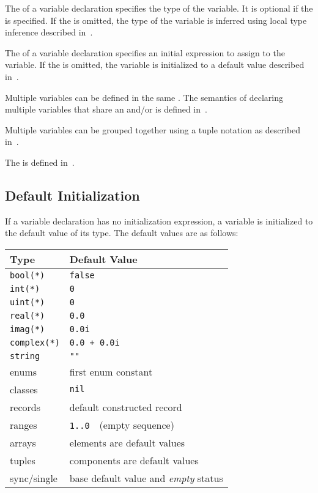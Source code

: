 The  of a variable declaration specifies the type of
the variable.  It is optional if the  is
specified.  If the  is omitted, the type of the
variable is inferred using local type inference described
in~.

The  of a variable declaration specifies an
initial expression to assign to the variable.  If
the  is omitted, the variable is initialized
to a default value described in~.

Multiple variables can be defined in the
same .  The semantics of declaring
multiple variables that share an 
and/or  is defined in~.

Multiple variables can be grouped together using a tuple notation as
described in~.

The  is defined
in~.

\subsection{Default Initialization}
\label{Default_Values_For_Types}

If a variable declaration has no initialization expression, a variable
is initialized to the default value of its type.  The default values
are as follows:
\begin{center}
\begin{tabular}{|l|l|}
\hline
{\bf Type} & {\bf Default Value} \\
\hline
{\tt bool(*)} & {\tt false} \\
{\tt int(*)} & {\tt 0} \\
{\tt uint(*)} & {\tt 0} \\
{\tt real(*)} & {\tt 0.0} \\
{\tt imag(*)} & {\tt 0.0i} \\
{\tt complex(*)} & {\tt 0.0 + 0.0i} \\
{\tt string} & {\tt ""} \\
enums & first enum constant \\
classes & {\tt nil} \\
records & default constructed record \\
ranges & {\tt 1..0} $ $ $ $ (empty sequence) \\
arrays & elements are default values \\
tuples & components are default values \\
sync/single & base default value and \emph{empty} status \\
\hline
\end{tabular}
\end{center}

